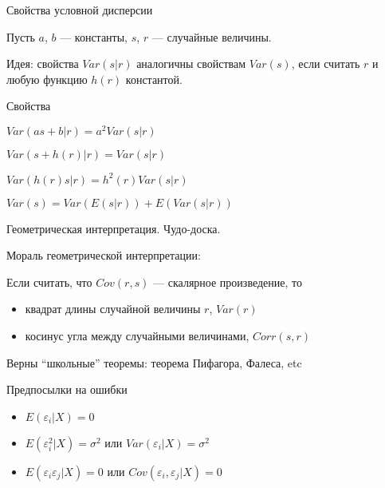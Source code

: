 \documentclass[ignorenonframetext,]{beamer}
\begin{document}
\begin{frame}{Свойства условной дисперсии}

Пусть $a$, $b$ --- константы, $s$, $r$ --- случайные величины.

Идея: свойства $Var(s|r)$ аналогичны свойствам $Var(s)$, если считать
$r$ и любую функцию $h(r)$ константой.

\end{frame}

\begin{frame}{Свойства}

$Var(as+b|r)=a^2Var(s|r)$

$Var(s+h(r)|r)=Var(s|r)$

$Var(h(r)s|r)=h^2(r)Var(s|r)$

$Var(s)=Var(E(s|r))+E(Var(s|r))$

\end{frame}

\begin{frame}{Геометрическая интерпретация. Чудо-доска.}

\end{frame}

\begin{frame}{Мораль геометрической интерпретации:}

Если считать, что $Cov(r,s)$ --- скалярное произведение, то

\begin{itemize}
\item
  квадрат длины случайной величины $r$, $Var(r)$
\item
  косинус угла между случайными величинами, $Corr(s,r)$
\end{itemize}

Верны ``школьные'' теоремы: теорема Пифагора, Фалеса, etc

\end{frame}

\begin{frame}{Предпосылки на ошибки}

\begin{itemize}
\item
  $E(\varepsilon_i |X)=0$
\item
  $E(\varepsilon_i^2|X)=\sigma^2$ или $Var(\varepsilon_i|X)=\sigma^2$
\item
  $E(\varepsilon_i \varepsilon_j|X)=0$ или
  $Cov(\varepsilon_i,\varepsilon_j|X)=0$
\end{itemize}

\end{frame}
\end{document}
